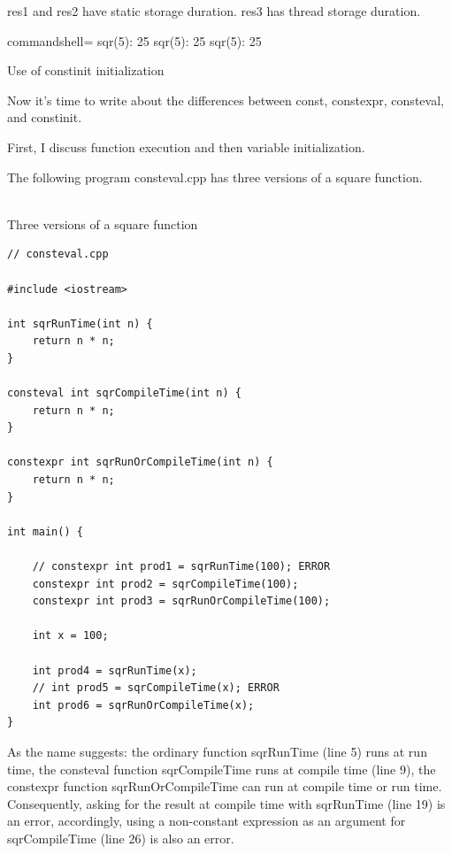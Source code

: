 res1 and res2 have static storage duration. res3 has thread storage duration.

\begin{tcblisting}{commandshell={}}
sqr(5): 25
sqr(5): 25
sqr(5): 25
\end{tcblisting}

\begin{center}
Use of constinit initialization
\end{center}

Now it’s time to write about the differences between const, constexpr, consteval, and constinit.

First, I discuss function execution and then variable initialization.


The following program consteval.cpp has three versions of a square function.

\hspace*{\fill} \\ %
\noindent
Three versions of a square function
\begin{lstlisting}[style=styleCXX]
// consteval.cpp

#include <iostream>

int sqrRunTime(int n) {
	return n * n;
}

consteval int sqrCompileTime(int n) {
	return n * n;
}

constexpr int sqrRunOrCompileTime(int n) {
	return n * n;
}

int main() {

	// constexpr int prod1 = sqrRunTime(100); ERROR
	constexpr int prod2 = sqrCompileTime(100);
	constexpr int prod3 = sqrRunOrCompileTime(100);

	int x = 100;
	
	int prod4 = sqrRunTime(x);
	// int prod5 = sqrCompileTime(x); ERROR
	int prod6 = sqrRunOrCompileTime(x);
}
\end{lstlisting}

As the name suggests: the ordinary function sqrRunTime (line 5) runs at run time, the consteval function sqrCompileTime runs at compile time (line 9), the constexpr function sqrRunOrCompileTime can run at compile time or run time. Consequently, asking for the result at compile time with sqrRunTime (line 19) is an error, accordingly, using a non-constant expression as an argument for sqrCompileTime (line 26) is also an error.

